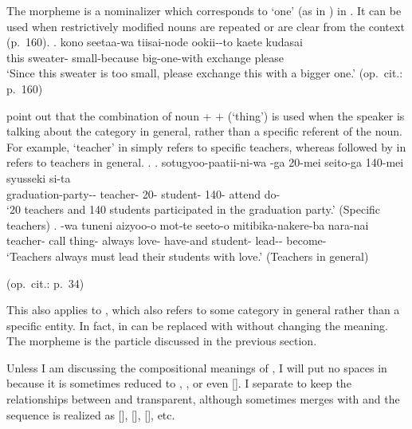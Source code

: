 The morpheme  is a nominalizer which corresponds to `one' (as in ) in .
It can be used when restrictively modified nouns are repeated or are clear from the context (p.\ 160).
%
\exg. kono seetaa-wa tiisai-node ookii--to kaete kudasai \\
	this sweater- small-because big-one-with exchange please \\
	`Since this sweater is too small, please exchange this with a bigger one.'
	\hfill{(op.\ cit.: p.\ 160)}

 point out that
the combination of noun +  +  (`thing') is used
when the speaker is talking about the category in general,
rather than a specific referent of the noun.
For example,  `teacher' in \Next[a] simply refers to specific teachers,
whereas  followed by  in \Next[b] refers to teachers in general.
%
\ex.
 \ag. sotugyoo-paatii-ni-wa -ga 20-mei seito-ga 140-mei syusseki si-ta \\
	graduation-party-- teacher- 20- student- 140- attend do- \\
	`20 teachers and 140 students participated in the graduation party.'
	\hfill{(Specific teachers)}
 \bg.   -wa tuneni aizyoo-o mot-te seeto-o mitibika-nakere-ba nara-nai \\
 teacher- call thing- always love- have-and student- lead-- become- \\
 `Teachers always must lead their students with love.'
 \hfill{(Teachers in general)}
 \begin{flushright}
 	(op.\ cit.: p.\ 34)
 \end{flushright}

This also applies to , which also refers to some category in general rather than a specific entity.
In fact,  in \Last[b] can be replaced with  without changing the meaning.
The morpheme  is the particle discussed in the previous section.

Unless I am discussing the compositional meanings of ,
I will put no spaces in 
because it is sometimes reduced to , , or even [].
I separate  to keep the relationships between  and  transparent,
although  sometimes merges with 
and the sequence is realized as [], [], [], etc.

